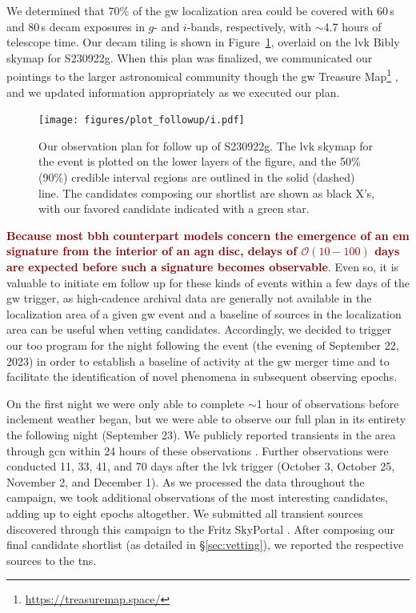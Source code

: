 \documentclass[twocolumn]{aastex631}
\newcommand{\gweventid}{S230922g\xspace}
\newcommand{\response}[1]{\textbf{\textcolor{maroon}{#1}}}
\begin{document}
We determined that 70\% of the \gls{gw} localization area could be covered with 60\,s and 80\,s \gls{decam} exposures in $g$- and $i$-bands, respectively, with $\sim$4.7 hours of telescope time.
Our \gls{decam} tiling is shown in Figure~\ref{fig:plot_followup}, overlaid on the \gls{lvk} Bibly skymap \citep{ligoscientificcollaborationLIGOVirgoKAGRA2023a} for \gweventid.
When this plan was finalized, we communicated our pointings to the larger astronomical community though the \gls{gw} Treasure Map\footnote{\url{https://treasuremap.space/}} \citep{Wyatt_2020}, and we updated information appropriately as we executed our plan.

\begin{figure}
    \centering
    \texttt{[image: figures/plot\_followup/i.pdf]}
    \caption{
        Our observation plan for follow up of \gweventid.
        The \gls{lvk} skymap for the event is plotted on the lower layers of the figure, and the 50\% (90\%) credible interval regions are outlined in the solid (dashed) line.
        The candidates composing our shortlist are shown as black X's, with our favored candidate indicated with a green star.
    }
    \label{fig:plot_followup}
\end{figure}

\response{Because most \gls{bbh} counterpart models concern the emergence of an \gls{em} signature from the interior of an \gls{agn} disc, delays of $\mathcal{O}(10-100)$ days are expected before such a signature becomes observable}.
Even so, it is valuable to initiate \gls{em} follow up for these kinds of events within a few days of the \gls{gw} trigger, as high-cadence archival data are generally not available in the localization area of a given \gls{gw} event and a baseline of sources in the localization area can be useful when vetting candidates.
Accordingly, we decided to trigger our \gls{too} program for the night following the event (the evening of September 22, 2023) in order to establish a baseline of activity at the \gls{gw} merger time and to facilitate the identification of novel phenomena in subsequent observing epochs.

On the first night we were only able to complete $\sim$1 hour of observations before inclement weather began, but we were able to observe our full plan in its entirety the following night (September 23).
We publicly reported transients in the area through  \gls{gcn} within 24 hours of these observations \citep{2023GCN.34763....1C}.
Further observations were conducted 11, 33, 41, and 70 days after the \gls{lvk} trigger (October 3, October 25, November 2, and December 1).
As we processed the data throughout the campaign, we took additional observations of the most interesting candidates, adding up to eight epochs altogether.
We submitted all transient sources discovered through this campaign to the Fritz SkyPortal \citep{skyportal2019,coughlinDataSciencePlatform2023}.
After composing our final candidate shortlist (as detailed in \S\ref{sec:vetting}), we reported the respective sources to the \gls{tns}.
\end{document}
